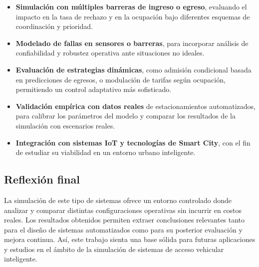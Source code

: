 \documentclass[12pt]{article}
\begin{document}
\begin{itemize}
    \item \textbf{Simulación con múltiples barreras de ingreso o egreso}, evaluando el impacto en la tasa de rechazo y en la ocupación bajo diferentes esquemas de coordinación y prioridad.

    \item \textbf{Modelado de fallas en sensores o barreras}, para incorporar análisis de confiabilidad y robustez operativa ante situaciones no ideales.

    \item \textbf{Evaluación de estrategias dinámicas}, como admisión condicional basada en predicciones de egresos, o modulación de tarifas según ocupación, permitiendo un control adaptativo más sofisticado.

    \item \textbf{Validación empírica con datos reales} de estacionamientos automatizados, para calibrar los parámetros del modelo y comparar los resultados de la simulación con escenarios reales.

    \item \textbf{Integración con sistemas IoT y tecnologías de Smart City}, con el fin de estudiar su viabilidad en un entorno urbano inteligente.
\end{itemize}

\subsection{Reflexión final}

La simulación de este tipo de sistemas ofrece un entorno controlado donde analizar y comparar distintas configuraciones operativas sin incurrir en costos reales. Los resultados obtenidos permiten extraer conclusiones relevantes tanto para el diseño de sistemas automatizados como para su posterior evaluación y mejora continua. Así, este trabajo sienta una base sólida para futuras aplicaciones y estudios en el ámbito de la simulación de sistemas de acceso vehicular inteligente.
\end{document}

